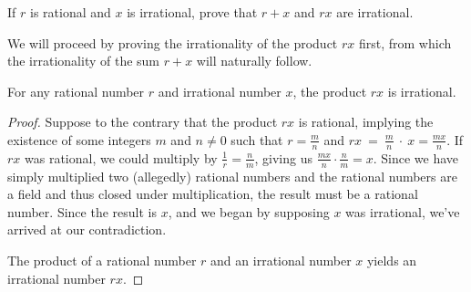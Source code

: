\begin{exercise}
	If $r$ is rational and $x$ is irrational, prove that $r + x$ and $rx$ are irrational.
\end{exercise}

We will proceed by proving the irrationality of the product $rx$ first, from which the irrationality of the sum $r + x$ will naturally follow.

\begin{proposition}
	For any rational number $r$ and irrational number $x$, the product $rx$ is irrational.
\end{proposition}
\begin{proof}
	Suppose to the contrary that the product $rx$ is rational, implying the existence of some integers $m$ and $n \neq 0$ such that $r = \frac{m}{n}$ and $rx~=~\frac{m}{n}~\cdot~x = \frac{mx}{n}$. If $rx$ was rational, we could multiply by $\frac{1}{r} = \frac{n}{m}$, giving us $\frac{mx}{n} \cdot \frac{n}{m} = x$. Since we have simply multiplied two (allegedly) rational numbers and the rational numbers are a field and thus closed under multiplication, the result must be a rational number. Since the result is $x$, and we began by supposing $x$ was irrational, we've arrived at our contradiction.
	
	The product of a rational number $r$ and an irrational number $x$ yields an irrational number $rx$. 
\end{proof}

